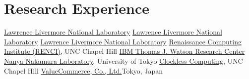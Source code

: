 \section{Research Experience}
		{\href{http://www.llnl.gov}{Lawrence Livermore National Laboratory}}{}{}
		{\href{http://www.llnl.gov}{Lawrence Livermore National Laboratory}}{}{}
		{\href{http://www.llnl.gov}{Lawrence Livermore National Laboratory}}{}{}
		{\href{http://www.renci.org}{Renaissance Computing Institute (RENCI)}, UNC Chapel Hill}{}{}{}
		{\href{http://www.watson.ibm.com}{IBM Thomas J. Watson Research Center}}{}{}{}
		{\href{http://www.hal.rcast.u-tokyo.ac.jp/}{Nanya-Nakamura Laboratory}, University of Tokyo}{}{}{}
		{\href{http://www.cs.unc.edu/~montek/}{Clockless Computing}, UNC Chapel Hill}{}{}{}
		{\href{http://valuecommerce.com}{ValueCommerce, Co., Ltd.}}{Tokyo, Japan}{}{}

